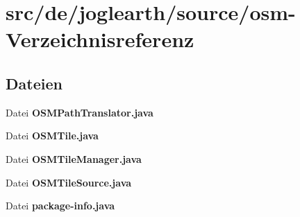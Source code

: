 \section{src/de/joglearth/source/osm-\/\-Verzeichnisreferenz}
\label{dir_f54835698247dfdc178da620aa37a8ec}
\subsection*{Dateien}
\begin{DoxyCompactItemize}
\item 
Datei {\bfseries O\-S\-M\-Path\-Translator.\-java}
\item 
Datei {\bfseries O\-S\-M\-Tile.\-java}
\item 
Datei {\bfseries O\-S\-M\-Tile\-Manager.\-java}
\item 
Datei {\bfseries O\-S\-M\-Tile\-Source.\-java}
\item 
Datei {\bfseries package-\/info.\-java}
\end{DoxyCompactItemize}
